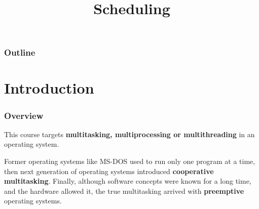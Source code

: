 %
%
%
%
%
%

%
%

%
%

\def\path{../../../..}

%
%



%
%

\title{Scheduling}

%
%



%
%

\begin{frame}
  \titlepage
\end{frame}

%
%

\begin{frame}
  \frametitle{Outline}

  \tableofcontents
\end{frame}

%
%



%
%

%
%

\section{Introduction}


\begin{frame}
  \frametitle{Overview}

  This course targets \textbf{multitasking, multiprocessing or multithreading} in an operating system.

  \-

Former operating systems like MS-DOS used to run only one program at a time, then next generation of operating systems introduced \textbf{cooperative multitasking}. Finally, although software concepts were known for a long time, and the hardware allowed it, the true multitasking arrived with \textbf{preemptive} operating systems.    
 
\end{frame}

